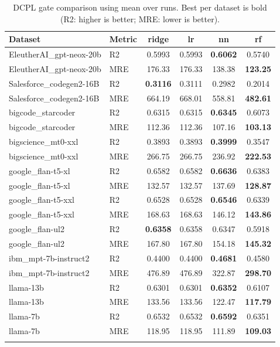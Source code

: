 \begin{table}[t]
\centering
\small
\caption{DCPL gate comparison using mean over runs. Best per dataset is bold (R2: higher is better; MRE: lower is better).}
\label{tab:dcpl-gate-compare-boldbest}
\begin{tabular}{llcccc}
\toprule
Dataset & Metric & ridge & lr & nn & rf \\
\midrule
EleutherAI\_gpt-neox-20b & R2 & 0.5993 & 0.5993 & \textbf{0.6062} & 0.5740 \\
EleutherAI\_gpt-neox-20b & MRE & 176.33 & 176.33 & 138.38 & \textbf{123.25} \\
\addlinespace
Salesforce\_codegen2-16B & R2 & \textbf{0.3116} & 0.3111 & 0.2982 & 0.2014 \\
Salesforce\_codegen2-16B & MRE & 664.19 & 668.01 & 558.81 & \textbf{482.61} \\
\addlinespace
bigcode\_starcoder & R2 & 0.6315 & 0.6315 & \textbf{0.6345} & 0.6073 \\
bigcode\_starcoder & MRE & 112.36 & 112.36 & 107.16 & \textbf{103.13} \\
\addlinespace
bigscience\_mt0-xxl & R2 & 0.3893 & 0.3893 & \textbf{0.3999} & 0.3547 \\
bigscience\_mt0-xxl & MRE & 266.75 & 266.75 & 236.92 & \textbf{222.53} \\
\addlinespace
google\_flan-t5-xl & R2 & 0.6582 & 0.6582 & \textbf{0.6636} & 0.6383 \\
google\_flan-t5-xl & MRE & 132.57 & 132.57 & 137.69 & \textbf{128.87} \\
\addlinespace
google\_flan-t5-xxl & R2 & 0.6528 & 0.6528 & \textbf{0.6546} & 0.6339 \\
google\_flan-t5-xxl & MRE & 168.63 & 168.63 & 146.12 & \textbf{143.86} \\
\addlinespace
google\_flan-ul2 & R2 & \textbf{0.6358} & 0.6358 & 0.6347 & 0.5918 \\
google\_flan-ul2 & MRE & 167.80 & 167.80 & 154.18 & \textbf{145.32} \\
\addlinespace
ibm\_mpt-7b-instruct2 & R2 & 0.4400 & 0.4400 & \textbf{0.4681} & 0.4580 \\
ibm\_mpt-7b-instruct2 & MRE & 476.89 & 476.89 & 322.87 & \textbf{298.70} \\
\addlinespace
llama-13b & R2 & 0.6301 & 0.6301 & \textbf{0.6352} & 0.6107 \\
llama-13b & MRE & 133.56 & 133.56 & 122.47 & \textbf{117.79} \\
\addlinespace
llama-7b & R2 & 0.6532 & 0.6532 & \textbf{0.6592} & 0.6351 \\
llama-7b & MRE & 118.95 & 118.95 & 111.89 & \textbf{109.03} \\
\addlinespace
\bottomrule
\end{tabular}
\end{table}